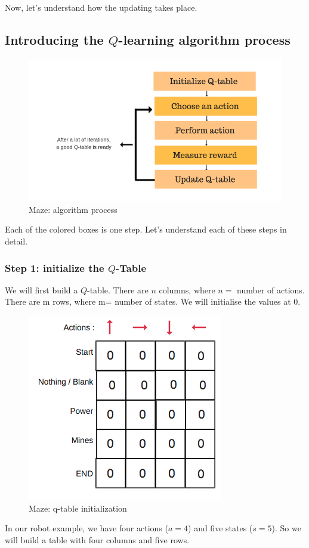 Now, let's understand how the updating takes place.


\subsection{Introducing the $Q$-learning algorithm process}

\begin{figure}[!htb]
\centering
\includegraphics[scale=0.4]{pix/q_learning/q_learning_algorithm_process.png}
\caption{Maze: algorithm process}
\end{figure}
Each of the colored boxes is one step. Let's understand each of these steps in detail.


\subsubsection{Step 1: initialize the $Q$-Table}
We will first build a $Q$-table. There are $n$ columns, where $n=$ number of actions. 
There are m rows, where m= number of states. We will initialise the values at 0.

\begin{figure}[!htb]
\centering
\includegraphics[scale=0.5]{pix/q_learning/q_robot_maze_table_init.png}
\caption{Maze: q-table initialization}
\end{figure}
In our robot example, we have four actions ($a=4$) and five states ($s=5$). So we will 
build a table with four columns and five rows.



